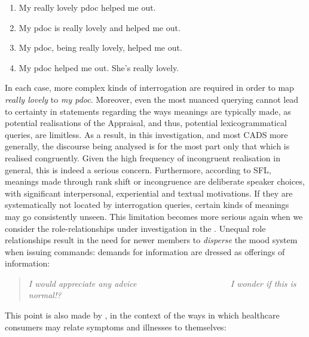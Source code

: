 \begin{multicols}{2}
\begin{enumerate}
\footnotesize
\setlength\itemsep{-0.5em}
\item My really lovely pdoc helped me out. %
\item My pdoc is really lovely and helped me out. %
\item My pdoc, being really lovely, helped me out. %
\item My pdoc helped me out. She's really lovely. %
\end{enumerate}
\end{multicols}
%
\noindent In each case, more complex kinds of interrogation are required in order to map \emph{really lovely} to \emph{my pdoc}. Moreover, even the most nuanced querying cannot lead to certainty in statements regarding the ways meanings are typically made, as potential realisations of the Appraisal, and thus, potential lexicogrammatical queries, are limitless. As a result, in this investigation, and most \gls{CADS} more generally, the discourse being analysed is for the most part only that which is realised congruently. Given the high frequency of incongruent realisation in general, this is indeed a serious concern. Furthermore, according to \gls{SFL}, meanings made through rank shift or incongruence are deliberate speaker choices, with significant interpersonal, experiential and textual motivations. If they are systematically not located by interrogation queries, certain kinds of meanings may go consistently unseen. This limitation becomes more serious again when we consider the role\hyp{}relationships under investigation in the . Unequal role relationships result in the need for newer \glspl{member} to \emph{disperse} the mood system when issuing commands: demands for information are dressed as offerings of information:

\begin{quote}
\emph{I would appreciate any advice~~~~~~~~~~~~~~~~~~~~~~I wonder if this is normal!?}
\end{quote}

This point is also made by \textcite{slade_emergency_2008}, in the context of the ways in which healthcare consumers may relate symptoms and illnesses to themselves:

